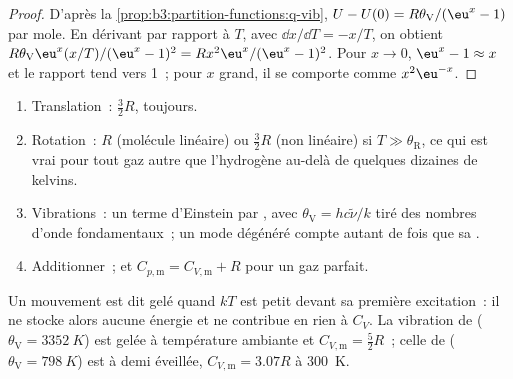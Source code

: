 \begin{proof}
D'après la \cref{prop:b3:partition-functions:q-vib}, $U - U(0) = R\theta_{\mathrm V}/(\eu^x - 1)$
par mole. En dérivant par rapport à $T$, avec $\dd x/\dd T = -x/T$, on
obtient
$R\theta_{\mathrm V}\eu^x(x/T)/(\eu^x - 1)^2 = Rx^2\eu^x/(\eu^x - 1)^2$. Pour $x \to 0$, $\eu^x - 1 \approx x$ et le
rapport tend vers 1~; pour $x$ grand, il se comporte comme $x^2\eu^{-x}$.
\end{proof}

\begin{method}\label{met:b3:statistical-thermo-applied:cv}
\begin{enumerate}
  \item Translation~: $\frac32R$, toujours.
  \item Rotation~: $R$ (molécule linéaire) ou $\frac32R$ (non linéaire)
        si $T \gg \theta_{\mathrm R}$, ce qui est vrai pour tout
        gaz autre que l'hydrogène au-delà de quelques dizaines de kelvins.
  \item Vibrations~: un terme d'Einstein par , avec
        $\theta_{\mathrm V} = hc\tilde\nu/k$ tiré
        des nombres d'onde fondamentaux~; un mode dégénéré compte autant
        de fois que sa .
  \item Additionner~; et $C_{p,\mathrm m} = C_{V,\mathrm m} + R$ pour un
        gaz parfait.
\end{enumerate}
\end{method}

Un mouvement est dit gelé quand $kT$ est petit devant sa première
excitation~: il ne stocke alors aucune énergie et ne contribue en rien à
$C_V$. La vibration de  ($\theta_{\mathrm V} = \qty{3352}{K}$) est
gelée à température ambiante et
$C_{V,\mathrm m} = \frac52R$~; celle de 
($\theta_{\mathrm V} = \qty{798}{K}$) est à demi éveillée,
$C_{V,\mathrm m} = 3.07R$ à \qty{300}{K}.

